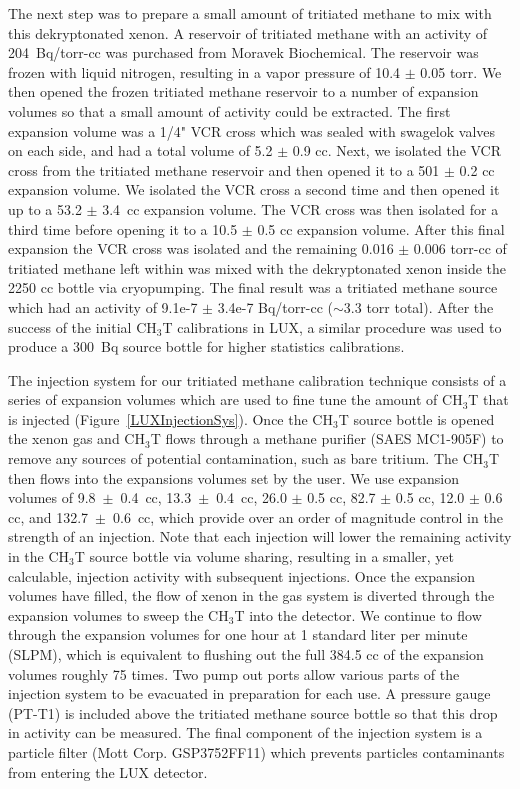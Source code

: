 The next step was to prepare a small amount of tritiated methane to mix with this dekryptonated xenon. A reservoir of tritiated methane with an activity of 204~Bq/torr-cc was purchased from Moravek Biochemical. The reservoir was frozen with liquid nitrogen, resulting in a vapor pressure of 10.4 $\pm$ 0.05 torr.  We then opened the frozen tritiated methane reservoir to a number of expansion volumes so that a small amount of activity could be extracted.  The first expansion volume was a 1/4" VCR cross which was sealed with swagelok valves on each side, and had a total volume of 5.2 $\pm$ 0.9 cc. Next, we isolated the VCR cross from the tritiated
methane reservoir and then opened it to a 501 $\pm$ 0.2 cc expansion volume. We isolated the VCR cross a second time and then opened it up to a 53.2 $\pm$ 3.4~cc expansion volume. The VCR cross was then isolated for a third time before opening it to a 10.5 $\pm$ 0.5 cc expansion volume. After this final expansion the VCR cross was isolated and the remaining 0.016 $\pm$ 0.006 torr-cc of tritiated methane left within was mixed with the dekryptonated xenon inside the 2250 cc bottle via cryopumping. The final result was a tritiated methane source which had an activity of 9.1e-7 $\pm$ 3.4e-7 Bq/torr-cc ($\sim$3.3 torr total).  After the success of the initial CH$_3$T calibrations in LUX, a similar procedure was used to produce a 300~Bq source bottle for higher statistics calibrations.

The injection system for our tritiated methane calibration technique consists of a series of expansion volumes which are used to fine tune the amount of CH$_3$T that is injected (Figure~\ref{LUXInjectionSys}). Once the CH$_3$T source bottle is opened the xenon gas and CH$_3$T flows through a methane purifier (SAES MC1-905F) to remove any sources of potential contamination, such as bare tritium. The CH$_3$T then flows into the expansions volumes set by the
user. We use expansion volumes of 9.8~$\pm$~0.4~cc, 13.3~$\pm$~0.4~cc, 26.0 $\pm$ 0.5 cc, 82.7 $\pm$ 0.5 cc, 12.0 $\pm$ 0.6 cc, and 132.7~$\pm$~0.6~cc, which provide over an order of magnitude control in the strength of an injection. Note that each injection will lower the remaining activity in the CH$_3$T source bottle via volume sharing, resulting in a smaller, yet calculable, injection activity with subsequent injections. Once the expansion volumes
have filled, the flow of xenon in the gas system is diverted through the expansion volumes to sweep the CH$_3$T into the detector. We continue to flow through the expansion volumes for one hour at 1 standard liter per minute (SLPM), which is equivalent to flushing out the full 384.5 cc of the expansion volumes roughly 75 times. Two pump out ports allow various parts of the injection system to be evacuated in preparation for each use. A pressure gauge (PT-T1) is included above the tritiated methane source
bottle so that this drop in activity can be measured. The final component of the injection system is a particle filter (Mott Corp. GSP3752FF11) which prevents particles contaminants from entering the LUX detector.

